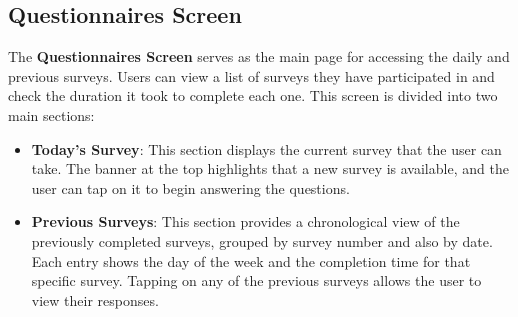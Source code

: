 \vspace{5mm}

\subsection{Questionnaires Screen}

\vspace{5mm}

The \textbf{Questionnaires Screen} serves as the main page for accessing the daily and previous surveys. Users can view a list of surveys they have participated in and check the duration it took to complete each one. This screen is divided into two main sections:

\begin{itemize}
    \item \textbf{Today's Survey}: This section displays the current survey that the user can take. The banner at the top highlights that a new survey is available, and the user can tap on it to begin answering the questions.
    \item \textbf{Previous Surveys}: This section provides a chronological view of the previously completed surveys, grouped by survey number and also by date. Each entry shows the day of the week and the completion time for that specific survey. Tapping on any of the previous surveys allows the user to view their responses.
\end{itemize}


